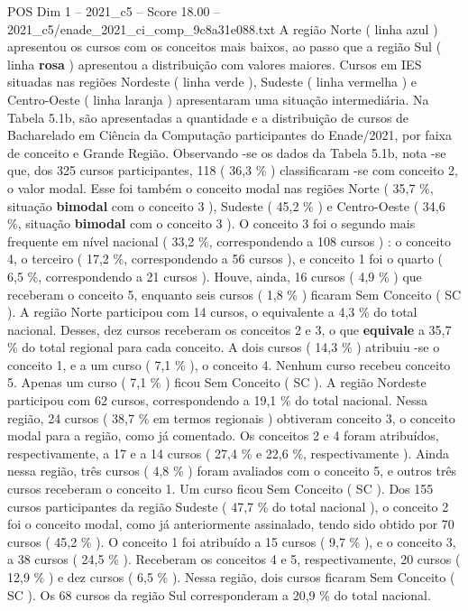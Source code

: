 \begin{textsample}{POS Dim 1 – 2021\_c5 – Score 18.00 – 2021\_c5/enade\_2021\_ci\_comp\_9c8a31e088.txt}
A região Norte ( linha azul ) apresentou os cursos com os conceitos mais baixos, ao passo que a região Sul ( linha \textbf{rosa} ) apresentou a distribuição com valores maiores.
Cursos em IES situadas nas regiões Nordeste ( linha verde ), Sudeste ( linha vermelha ) e Centro-Oeste ( linha laranja ) apresentaram uma situação intermediária.
Na Tabela 5.1b, são apresentadas a quantidade e a distribuição de cursos de Bacharelado em Ciência da Computação participantes do Enade/2021, por faixa de conceito e Grande Região.
Observando -se os dados da Tabela 5.1b, nota -se que, dos 325 cursos participantes, 118 ( 36,3 \% ) classificaram -se com conceito 2, o valor modal.
Esse foi também o conceito modal nas regiões Norte ( 35,7 \%, situação \textbf{bimodal} com o conceito 3 ), Sudeste ( 45,2 \% ) e Centro-Oeste ( 34,6 \%, situação \textbf{bimodal} com o conceito 3 ).
O conceito 3 foi o segundo mais frequente em nível nacional ( 33,2 \%, correspondendo a 108 cursos ) : o conceito 4, o terceiro ( 17,2 \%, correspondendo a 56 cursos ), e conceito 1 foi o quarto ( 6,5 \%, correspondendo a 21 cursos ).
Houve, ainda, 16 cursos ( 4,9 \% ) que receberam o conceito 5, enquanto seis cursos ( 1,8 \% ) ficaram Sem Conceito ( SC ).
A região Norte participou com 14 cursos, o equivalente a 4,3 \% do total nacional.
Desses, dez cursos receberam os conceitos 2 e 3, o que \textbf{equivale} a 35,7 \% do total regional para cada conceito.
A dois cursos ( 14,3 \% ) atribuiu -se o conceito 1, e a um curso ( 7,1 \% ), o conceito 4.
Nenhum curso recebeu conceito 5.
Apenas um curso ( 7,1 \% ) ficou Sem Conceito ( SC ).
A região Nordeste participou com 62 cursos, correspondendo a 19,1 \% do total nacional.
Nessa região, 24 cursos ( 38,7 \% em termos regionais ) obtiveram conceito 3, o conceito modal para a região, como já comentado.
Os conceitos 2 e 4 foram atribuídos, respectivamente, a 17 e a 14 cursos ( 27,4 \% e 22,6 \%, respectivamente ).
Ainda nessa região, três cursos ( 4,8 \% ) foram avaliados com o conceito 5, e outros três cursos receberam o conceito 1.
Um curso ficou Sem Conceito ( SC ).
Dos 155 cursos participantes da região Sudeste ( 47,7 \% do total nacional ), o conceito 2 foi o conceito modal, como já anteriormente assinalado, tendo sido obtido por 70 cursos ( 45,2 \% ).
O conceito 1 foi atribuído a 15 cursos ( 9,7 \% ), e o conceito 3, a 38 cursos ( 24,5 \% ).
Receberam os conceitos 4 e 5, respectivamente, 20 cursos ( 12,9 \% ) e dez cursos ( 6,5 \% ).
Nessa região, dois cursos ficaram Sem Conceito ( SC ).
Os 68 cursos da região Sul corresponderam a 20,9 \% do total nacional.

\end{textsample}
